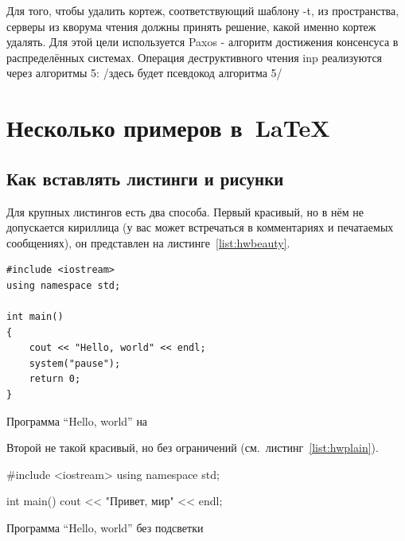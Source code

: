 Для того, чтобы удалить кортеж, соответствующий шаблону -t, из пространства, серверы из кворума чтения должны принять решение, какой именно кортеж удалять. Для этой цели используется Paxos - алгоритм достижения консенсуса в распределённых системах. Операция деструктивного чтения inp реализуются через алгоритмы 5: /здесь будет псевдокод алгоритма 5/



\section{Несколько примеров в~\LaTeX{}}
\label{sec:examples}
\subsection{Как вставлять листинги и рисунки}
Для крупных листингов есть два способа. Первый красивый, но в нём не допускается
кириллица (у вас может встречаться в комментариях и
печатаемых сообщениях), он представлен на листинге~\ref{list:hwbeauty}.
\begin{ListingEnv}[H]%
\begin{lstlisting}
#include <iostream>
using namespace std;

int main()
{
    cout << "Hello, world" << endl;
    system("pause");
    return 0;
}
\end{lstlisting}
\caption{Программа “Hello, world” на \protect\cpp}
\label{list:hwbeauty}
\end{ListingEnv}

Второй не такой красивый, но без ограничений (см.~листинг~\ref{list:hwplain}).
\begin{ListingEnv}[H]
\begin{Verb}

#include <iostream>
using namespace std;

int main()
{
    cout << "Привет, мир" << endl;
}
\end{Verb}
\caption{Программа “Hello, world” без подсветки}
\label{list:hwplain}
\end{ListingEnv}

